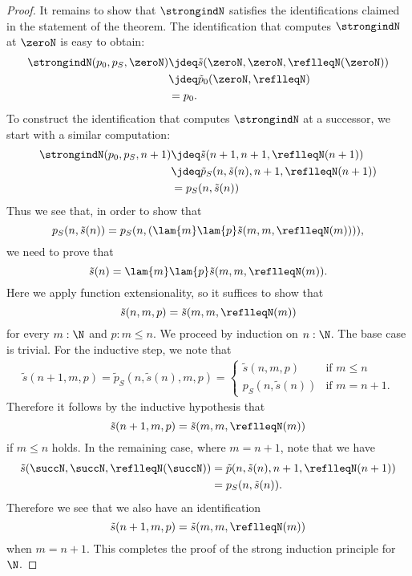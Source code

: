 \begin{proof}
  It remains to show that $\strongindN$ satisfies the identifications claimed in the statement of the theorem. The identification that computes $\strongindN$ at $\zeroN$ is easy to obtain:
  \begin{align*}
    \strongindN(p_0,p_S,\zeroN) & \jdeq \tilde{s}(\zeroN,\zeroN,\reflleqN(\zeroN)) \\
                                & \jdeq \tilde{p}_{0}(\zeroN,\reflleqN) \\
                                & = p_0.
  \end{align*}
  To construct the identification that computes $\strongindN$ at a successor, we start with a similar computation:
  \begin{align*}
    \strongindN(p_0,p_S,n+1) & \jdeq \tilde{s}(n+1,n+1,\reflleqN(n+1)) \\
                                   & \jdeq \tilde{p}_S(n,\tilde{s}(n),n+1,\reflleqN(n+1)) \\
    & = p_S(n,\tilde{s}(n))
  \end{align*}
  Thus we see that, in order to show that
  \begin{equation*}
    p_S(n,\tilde{s}(n))=p_S(n,(\lam{m}\lam{p}\tilde{s}(m,m,\reflleqN(m)))),
  \end{equation*}
  we need to prove that
  \begin{equation*}
    \tilde{s}(n)=\lam{m}\lam{p}\tilde{s}(m,m,\reflleqN(m)).
  \end{equation*}
  Here we apply function extensionality, so it suffices to show that
  \begin{equation*}
    \tilde{s}(n,m,p)=\tilde{s}(m,m,\reflleqN(m))
  \end{equation*}
  for every $m:\N$ and $p:m\leq n$. We proceed by induction on $n:\N$. The base case is trivial. For the inductive step, we note that
  \begin{align*}
    \tilde{s}(n+1,m,p)=\tilde{p}_S(n,\tilde{s}(n),m,p)=\begin{cases}\tilde{s}(n,m,p) & \text{if }m\leq n \\
    p_S(n,\tilde{s}(n)) & \text{if }m=n+1.\end{cases}
  \end{align*}
  Therefore it follows by the inductive hypothesis that
  \begin{equation*}
    \tilde{s}(n+1,m,p)=\tilde{s}(m,m,\reflleqN(m))
  \end{equation*}
  if $m\leq n$ holds. In the remaining case, where $m=n+1$, note that we have
  \begin{align*}
    \tilde{s}(\succN,\succN,\reflleqN(\succN)) & = \tilde{p}(n,\tilde{s}(n),n+1,\reflleqN(n+1)) \\
    & = p_S(n,\tilde{s}(n)).
  \end{align*}
  Therefore we see that we also have an identification
  \begin{equation*}
    \tilde{s}(n+1,m,p)=\tilde{s}(m,m,\reflleqN(m))
  \end{equation*}
  when $m=n+1$. This completes the proof of the strong induction principle for $\N$.
\end{proof}

